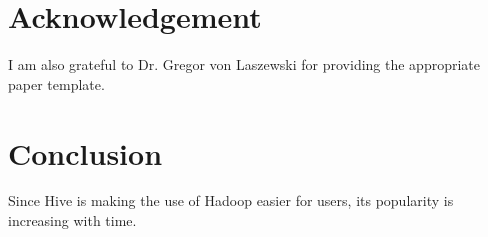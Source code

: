 \documentclass[9pt,twocolumn,twoside]{../../styles/osajnl}
\begin{document}
\section{Acknowledgement}
I am also grateful to Dr. Gregor von Laszewski for providing the appropriate paper template.


\section{Conclusion}
Since Hive is making the use of Hadoop easier for users, its popularity is increasing with time.




\end{document}
